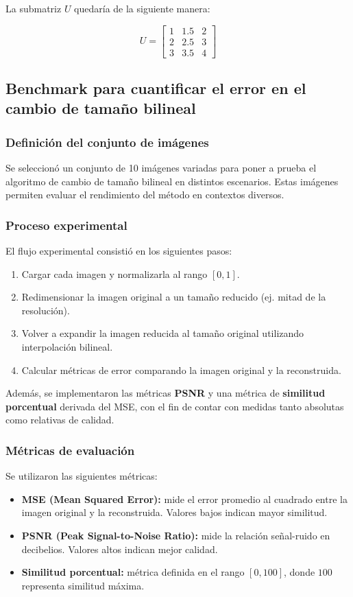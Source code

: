 \documentclass[12pt,a4paper]{article}
\begin{document}
La submatriz $U$ quedaría de la siguiente manera:

\[
U =
    \begin{bmatrix}
    1 & 1.5 & 2 \\
    2 & 2.5 & 3 \\
    3 & 3.5 & 4
    \end{bmatrix}
\]

\subsection{Benchmark para cuantificar el error en el cambio de tamaño bilineal}

\subsubsection{Definición del conjunto de imágenes}
Se seleccionó un conjunto de 10 imágenes variadas para poner a prueba 
el algoritmo de cambio de tamaño bilineal en distintos escenarios. 
Estas imágenes permiten evaluar el rendimiento del método en contextos diversos.

\subsubsection{Proceso experimental}
El flujo experimental consistió en los siguientes pasos:
\begin{enumerate}
    \item Cargar cada imagen y normalizarla al rango $[0,1]$.
    \item Redimensionar la imagen original a un tamaño reducido (ej. mitad de la resolución).
    \item Volver a expandir la imagen reducida al tamaño original utilizando interpolación bilineal.
    \item Calcular métricas de error comparando la imagen original y la reconstruida.
\end{enumerate}

Además, se implementaron las métricas \textbf{PSNR} y una métrica de 
\textbf{similitud porcentual} derivada del MSE, con el fin de contar 
con medidas tanto absolutas como relativas de calidad.

\subsubsection{Métricas de evaluación}
Se utilizaron las siguientes métricas:
\begin{itemize}
    \item \textbf{MSE (Mean Squared Error):} mide el error promedio al cuadrado 
    entre la imagen original y la reconstruida. Valores bajos indican mayor similitud.
    \item \textbf{PSNR (Peak Signal-to-Noise Ratio):} mide la relación señal-ruido 
    en decibelios. Valores altos indican mejor calidad.
    \item \textbf{Similitud porcentual:} métrica definida en el rango $[0,100]$, 
    donde $100$ representa similitud máxima.
\end{itemize}
\end{document}
